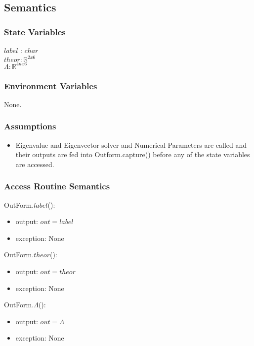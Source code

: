 \documentclass[12pt, titlepage]{article}
\begin{document}
\subsection{Semantics}

\subsubsection{State Variables}

$label$ : $char$ \\
$theor: \mathbb{R}^{2 x 6}$ \\
$\Lambda : \mathbb{R}^{4nx6}$

\subsubsection{Environment Variables}

None.

\subsubsection{Assumptions}

\begin{itemize}
	\item Eigenvalue and Eigenvector solver and 
	Numerical Parameters 
	are called and their outputs are fed into Outform.capture() 
	before any of the state variables are accessed. 
\end{itemize}

\subsubsection{Access Routine Semantics}

\noindent OutForm.$label$():
\begin{itemize}
	\item output: $out = label$
	\item exception: None
\end{itemize}


\noindent OutForm.$theor$():
\begin{itemize}
	\item output: $out = theor$
	\item exception: None
\end{itemize} 

\noindent OutForm.$\Lambda$():
\begin{itemize}
	\item output: $out = \Lambda$
	\item exception: None
\end{itemize}
\end{document}

